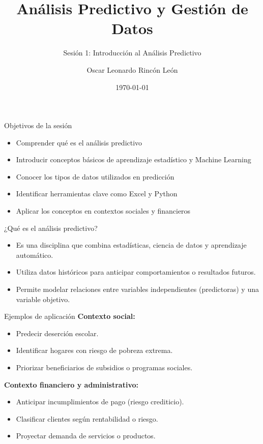 \documentclass{beamer}
\title{Análisis Predictivo y Gestión de Datos}
\subtitle{Sesión 1: Introducción al Análisis Predictivo}
\author{Oscar Leonardo Rincón León}
\date{\today}
\begin{document}
\frame{\titlepage}

\begin{frame}{Objetivos de la sesión}
\begin{itemize}
    \item Comprender qué es el análisis predictivo
    \item Introducir conceptos básicos de aprendizaje estadístico y Machine Learning
    \item Conocer los tipos de datos utilizados en predicción
    \item Identificar herramientas clave como Excel y Python
    \item Aplicar los conceptos en contextos sociales y financieros
\end{itemize}
\end{frame}

\begin{frame}{¿Qué es el análisis predictivo?}
	\begin{itemize}
		\item Es una disciplina que combina estadísticas, ciencia de datos y aprendizaje automático.
		\item Utiliza datos históricos para anticipar comportamientos o resultados futuros.
		\item Permite modelar relaciones entre variables independientes (predictoras) y una variable objetivo.
	\end{itemize}
\end{frame}

\begin{frame}{Ejemplos de aplicación}
	\textbf{Contexto social:}
	\begin{itemize}
		\item Predecir deserción escolar.
		\item Identificar hogares con riesgo de pobreza extrema.
		\item Priorizar beneficiarios de subsidios o programas sociales.
	\end{itemize}
	\vspace{0.3cm}
	\textbf{Contexto financiero y administrativo:}
	\begin{itemize}
		\item Anticipar incumplimientos de pago (riesgo crediticio).
		\item Clasificar clientes según rentabilidad o riesgo.
		\item Proyectar demanda de servicios o productos.
	\end{itemize}
\end{frame}
\end{document}
